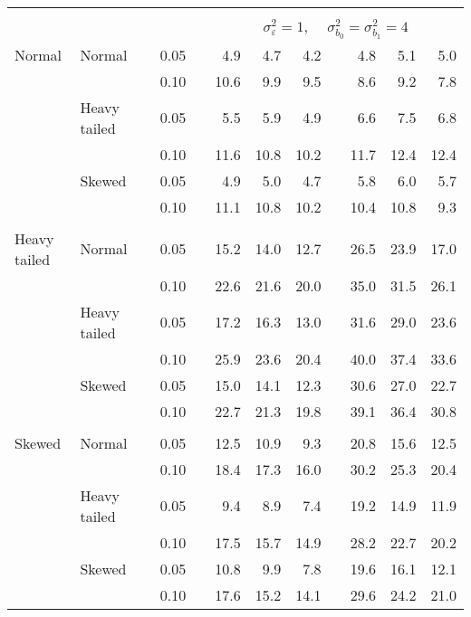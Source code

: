 \begin{table}[ht]
\begin{scriptsize}
\begin{tabular}{ll p{.1cm} c p{.1cm} rrr p{.1cm} rrr}
&&&&&&&&&&&\\
& && && \multicolumn{7}{c}{$\sigma_{\varepsilon}^2 = 1$, \ \ $\sigma_{b_0}^2 = \sigma_{b_1}^2 = 4$} \\ \cline{6-12}
\rowcolor{gray!20} Normal & Normal &  & 0.05 &  & 4.9 & 4.7 & 4.2 &  & 4.8 & 5.1 & 5.0 \\ 
\rowcolor{gray!20}    &  &  & 0.10 &  & 10.6 & 9.9 & 9.5 &  & 8.6 & 9.2 & 7.8 \\ 
\rowcolor{gray!20}    & Heavy tailed &  & 0.05 &  & 5.5 & 5.9 & 4.9 &  & 6.6 & 7.5 & 6.8 \\ 
\rowcolor{gray!20}    &  &  & 0.10 &  & 11.6 & 10.8 & 10.2 &  & 11.7 & 12.4 & 12.4 \\ 
\rowcolor{gray!20}    & Skewed &  & 0.05 &  & 4.9 & 5.0 & 4.7 &  & 5.8 & 6.0 & 5.7 \\ 
\rowcolor{gray!20}    &  &  & 0.10 &  & 11.1 & 10.8 & 10.2 &  & 10.4 & 10.8 & 9.3 \\ 
&&&&&&&&&&&\\
  Heavy tailed & Normal &  & 0.05 &  & 15.2 & 14.0 & 12.7 &  & 26.5 & 23.9 & 17.0 \\ 
   &  &  & 0.10 &  & 22.6 & 21.6 & 20.0 &  & 35.0 & 31.5 & 26.1 \\ 
   & Heavy tailed &  & 0.05 &  & 17.2 & 16.3 & 13.0 &  & 31.6 & 29.0 & 23.6 \\ 
   &  &  & 0.10 &  & 25.9 & 23.6 & 20.4 &  & 40.0 & 37.4 & 33.6 \\ 
   & Skewed &  & 0.05 &  & 15.0 & 14.1 & 12.3 &  & 30.6 & 27.0 & 22.7 \\ 
   &  &  & 0.10 &  & 22.7 & 21.3 & 19.8 &  & 39.1 & 36.4 & 30.8 \\ 
&&&&&&&&&&&\\
  Skewed & Normal &  & 0.05 &  & 12.5 & 10.9 & 9.3 &  & 20.8 & 15.6 & 12.5 \\ 
   &  &  & 0.10 &  & 18.4 & 17.3 & 16.0 &  & 30.2 & 25.3 & 20.4 \\ 
   & Heavy tailed &  & 0.05 &  & 9.4 & 8.9 & 7.4 &  & 19.2 & 14.9 & 11.9 \\ 
   &  &  & 0.10 &  & 17.5 & 15.7 & 14.9 &  & 28.2 & 22.7 & 20.2 \\ 
   & Skewed &  & 0.05 &  & 10.8 & 9.9 & 7.8 &  & 19.6 & 16.1 & 12.1 \\ 
   &  &  & 0.10 &  & 17.6 & 15.2 & 14.1 &  & 29.6 & 24.2 & 21.0 \\ 

\hline
\end{tabular}
\end{scriptsize}
\end{table}